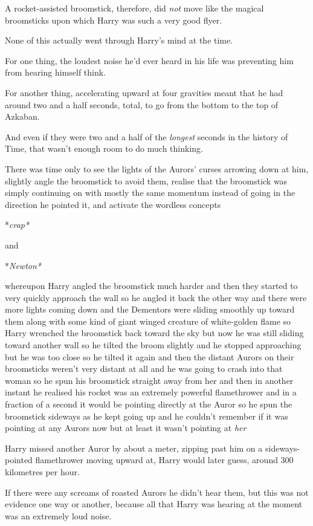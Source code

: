 A rocket-assisted broomstick, therefore, did \emph{not} move like the
magical broomsticks upon which Harry was such a very good flyer.

None of this actually went through Harry's mind at the time.

For one thing, the loudest noise he'd ever heard in his life was
preventing him from hearing himself think.

For another thing, accelerating upward at four gravities meant that he
had around two and a half seconds, total, to go from the bottom to the
top of Azkaban.

And even if they were two and a half of the \emph{longest} seconds in
the history of Time, that wasn't enough room to do much thinking.

There was time only to see the lights of the Aurors' curses arrowing
down at him, slightly angle the broomstick to avoid them, realise that
the broomstick was simply continuing on with mostly the same momentum
instead of going in the direction he pointed it, and activate the
wordless concepts

*\emph{crap*}

and

*\emph{Newton*}

whereupon Harry angled the broomstick much harder and then they started
to very quickly approach the wall so he angled it back the other way and
there were more lights coming down and the Dementors were sliding
smoothly up toward them along with some kind of giant winged creature of
white-golden flame so Harry wrenched the broomstick back toward the sky
but now he was still sliding toward another wall so he tilted the broom
slightly and he stopped approaching but he was too close so he tilted it
again and then the distant Aurors on their broomsticks weren't very
distant at all and he was going to crash into that woman so he spun his
broomstick straight away from her and then in another instant he
realised his rocket was an extremely powerful flamethrower and in a
fraction of a second it would be pointing directly at the Auror so he
spun the broomstick sideways as he kept going up and he couldn't
remember if it was pointing at any Aurors now but at least it wasn't
pointing at \emph{her}

Harry missed another Auror by about a meter, zipping past him on a
sideways-pointed flamethrower moving upward at, Harry would later guess,
around 300 kilometres per hour.

If there were any screams of roasted Aurors he didn't hear them, but
this was not evidence one way or another, because all that Harry was
hearing at the moment was an extremely loud noise.

